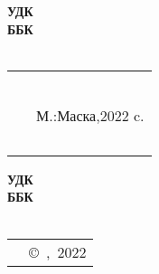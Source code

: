 {
\thispagestyle{empty}
%
\small{
\begin{flushleft}
\textbf{%
	УДК\UDK \\
	ББК\BBK \\
	\BibCode \\
}
\end{flushleft}
%
\vspace{3cm}
%
\begin{tabular}[c]{>{\raggedright}m{14mm} >{\raggedright}m{95mm} }
	\textbf{\BibCode} & \MyVarAuthorName \tabularnewline
	~ & \MyVarBookName \tabularnewline
	~ & М.:Маска,2022\mdash 128 c. \tabularnewline
	~ & \textbf{\ISBN}
\end{tabular}
%
\vspace{5.5cm}
%
\begin{flushright}
\textbf{%
	УДК\UDK \\
	ББК\BBK \\
	\BibCode \\
}
\end{flushright}
%
\vspace{1cm}
%
\begin{longtable}[c]{>{\raggedright}m{55mm} >{\raggedleft}m{55mm} }
	\textbf{\ISBN} & {\copyright~\MyVarAuthorName,~2022} \tabularnewline
\end{longtable}
}
}